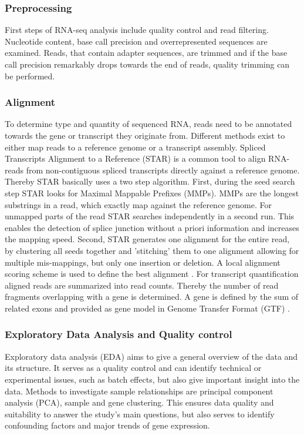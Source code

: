 \subsubsection{Preprocessing}
First steps of RNA-seq analysis include quality control and read filtering. Nucleotide content, base call precision and overrepresented sequences are examined. Reads, that contain adapter sequences, are trimmed and if the base call precision remarkably drops towards the end of reads, quality trimming can be performed.    

\subsubsection{Alignment}
To determine type and quantity of sequenced RNA, reads need to be annotated towards the gene or transcript they originate from. Different methods exist to either map reads to a reference genome or a transcript assembly. Spliced Transcripts Alignment to a Reference (STAR) is a common tool to align RNA-reads from non-contiguous spliced transcripts directly against a reference genome. Thereby STAR basically uses a two step algorithm. First, during the seed search step STAR looks for Maximal Mappable Prefixes (MMPs). MMPs are the longest substrings in a read, which exactly map against the reference genome. For unmapped parts of the read STAR searches independently in a second run. This enables the detection of splice junction without a priori information and increases the mapping speed. Second, STAR generates one alignment for the entire read, by clustering all seeds together and 'stitching' them to one alignment allowing for multiple mis-mappings, but only one insertion or deletion. A local alignment scoring scheme is used to define the best alignment \citep{Dobin2015}.
For transcript quantification aligned reads are summarized into read counts. Thereby the number of read fragments overlapping with a gene is determined. A gene is defined by the sum of related  exons and provided as gene model in Genome Transfer Format (GTF) \citep{Anders2010}.


\subsubsection{Exploratory Data Analysis and Quality control}
Exploratory data analysis (EDA) aims to give a general overview of the data and its structure. It serves as a quality control and can identify technical or experimental issues, such as batch effects, but also give important insight into the data. Methods to investigate sample relationships are principal component analysis (PCA), sample and gene clustering. This ensures data quality and suitability to answer the study's main questions, but also serves to identify confounding factors and major trends of gene expression. 

